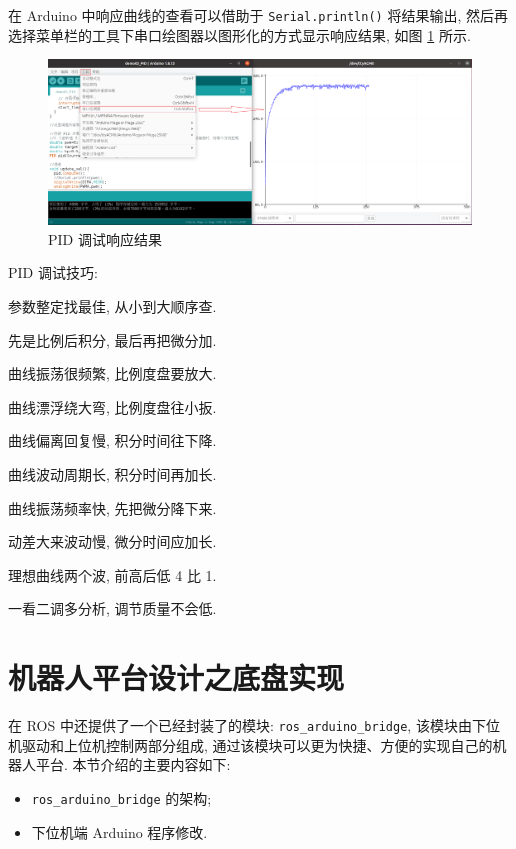 \documentclass[openany, fontset=windowsold]{ctexbook}
\theoremstyle{kaiti}
\theoremstyle{normal}
\begin{document}
在 Arduino 中响应曲线的查看可以借助于 \verb|Serial.println()| 将结果输出, 然后再选择菜单栏的工具下串口绘图器以图形化的方式显示响应结果, 如图 \ref{fig:PID_debug} 所示.

\begin{figure}[!ht]
  \centering
  \includegraphics[width=.9\textwidth]{PID_debug.png}
  \caption{PID 调试响应结果}
  \label{fig:PID_debug}
\end{figure}

PID 调试技巧:

\begin{center}
  \kaishu
  参数整定找最佳, 从小到大顺序查.

  先是比例后积分, 最后再把微分加.

  曲线振荡很频繁, 比例度盘要放大.

  曲线漂浮绕大弯, 比例度盘往小扳.

  曲线偏离回复慢, 积分时间往下降.

  曲线波动周期长, 积分时间再加长.

  曲线振荡频率快, 先把微分降下来.

  动差大来波动慢, 微分时间应加长.

  理想曲线两个波, 前高后低 4 比 1.

  一看二调多分析, 调节质量不会低.
\end{center}

\section{机器人平台设计之底盘实现}

在 ROS 中还提供了一个已经封装了的模块: \verb|ros_arduino_bridge|, 该模块由下位机驱动和上位机控制两部分组成, 通过该模块可以更为快捷、方便的实现自己的机器人平台. 本节介绍的主要内容如下:

\begin{itemize}
  \item \verb|ros_arduino_bridge| 的架构; 
  \item 下位机端 Arduino 程序修改.
\end{itemize}
\end{document}

